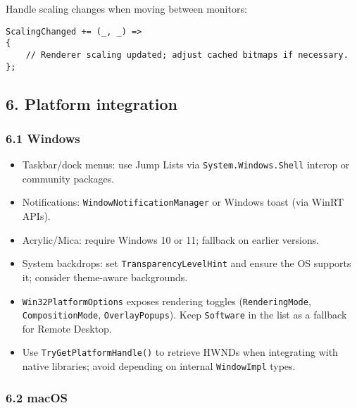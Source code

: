 Handle scaling changes when moving between monitors:

\begin{lstlisting}
ScalingChanged += (_, _) =>
{
    // Renderer scaling updated; adjust cached bitmaps if necessary.
};
\end{lstlisting}

\subsection{6. Platform integration}\label{platform-integration}

\subsubsection{6.1 Windows}\label{windows-1}

\begin{itemize}
\tightlist
\item
  Taskbar/dock menus: use Jump Lists via
  \passthrough{\lstinline!System.Windows.Shell!} interop or community
  packages.
\item
  Notifications: \passthrough{\lstinline!WindowNotificationManager!} or
  Windows toast (via WinRT APIs).
\item
  Acrylic/Mica: require Windows 10 or 11; fallback on earlier versions.
\item
  System backdrops: set \passthrough{\lstinline!TransparencyLevelHint!}
  and ensure the OS supports it; consider theme-aware backgrounds.
\item
  \passthrough{\lstinline!Win32PlatformOptions!} exposes rendering
  toggles (\passthrough{\lstinline!RenderingMode!},
  \passthrough{\lstinline!CompositionMode!},
  \passthrough{\lstinline!OverlayPopups!}). Keep
  \passthrough{\lstinline!Software!} in the list as a fallback for
  Remote Desktop.
\item
  Use \passthrough{\lstinline!TryGetPlatformHandle()!} to retrieve HWNDs
  when integrating with native libraries; avoid depending on internal
  \passthrough{\lstinline!WindowImpl!} types.
\end{itemize}

\subsubsection{6.2 macOS}\label{macos-1}

